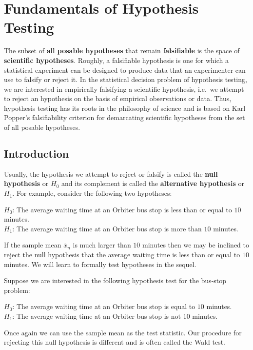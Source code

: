 \section{Fundamentals of Hypothesis Testing}\label{S:HypTest}

The subset of {\bf all posable hypotheses} that remain {\bf falsifiable} is the space of {\bf scientific hypotheses}.  Roughly, a falsifiable hypothesis is one for which a statistical experiment can be designed to produce data that an experimenter can use to falsify or reject it.  In the statistical decision problem of hypothesis testing, we are interested in empirically falsifying a scientific hypothesis, i.e.~we attempt to reject an hypothesis on the basis of empirical observations or data.  Thus, hypothesis testing has its roots in the philosophy of science and is based on Karl Popper's falsifiability criterion for demarcating scientific hypotheses from the set of all posable hypotheses.

\subsection{Introduction}\label{S:HypTestIntro}
Usually, the hypothesis we attempt to reject or falsify is called the {\bf null hypothesis} or $H_0$ and its complement is called the {\bf alternative hypothesis} or $H_1$.  For example, consider the following two hypotheses:

$H_0$:  The average waiting time at an Orbiter bus stop is less than or equal to $10$ minutes.\\
$H_1$:  The average waiting time at an Orbiter bus stop is more than $10$ minutes.

If the sample mean $\overline{x}_n$ is much larger than $10$ minutes then we may be inclined to reject the null hypothesis that the average waiting time is less than or equal to $10$ minutes.  We will learn to formally test hypotheses in the sequel.

Suppose we are interested in the following hypothesis test for the bus-stop  problem:

$H_0$:  The average waiting time at an Orbiter bus stop is equal to $10$ minutes.\\
$H_1$:  The average waiting time at an Orbiter bus stop is not $10$ minutes.

Once again we can use the sample mean as the test statistic.  Our procedure for rejecting this null hypothesis is different and is often called the Wald test.

